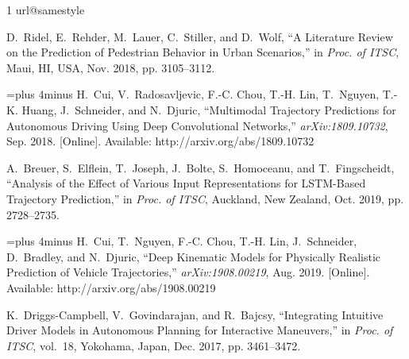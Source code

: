 \documentclass[a4paper, 10pt, conference]{ieeeconf}      %
\begin{document}
   \nocite{*}
\begin{thebibliography}{1}
\providecommand{\url}[1]{#1}
\csname url@samestyle\endcsname
\providecommand{\newblock}{\relax}
\providecommand{\bibinfo}[2]{#2}
\providecommand{\BIBentrySTDinterwordspacing}{\spaceskip=0pt\relax}
\providecommand{\BIBentryALTinterwordstretchfactor}{4}
\providecommand{\BIBentryALTinterwordspacing}{\spaceskip=\fontdimen2\font plus
\BIBentryALTinterwordstretchfactor\fontdimen3\font minus
  \fontdimen4\font\relax}
\providecommand{\BIBforeignlanguage}[2]{{%
\expandafter\ifx\csname l@#1\endcsname\relax
\typeout{** WARNING: IEEEtran.bst: No hyphenation pattern has been}%
\typeout{** loaded for the language `#1'. Using the pattern for}%
\typeout{** the default language instead.}%
\else
\language=\csname l@#1\endcsname
\fi
#2}}
\providecommand{\BIBdecl}{\relax}
\BIBdecl


D.~Ridel, E.~Rehder, M.~Lauer, C.~Stiller, and D.~Wolf, ``A {Literature}
  {Review} on the {Prediction} of {Pedestrian} {Behavior} in {Urban}
  {Scenarios},'' in \emph{Proc. of {ITSC}}, Maui, HI, USA, Nov. 2018, pp.
  3105--3112.

\BIBentryALTinterwordspacing
H.~Cui, V.~Radosavljevic, F.-C. Chou, T.-H. Lin, T.~Nguyen, T.-K. Huang,
  J.~Schneider, and N.~Djuric, ``Multimodal {Trajectory} {Predictions} for
  {Autonomous} {Driving} {Using} {Deep} {Convolutional} {Networks},''
  \emph{arXiv:1809.10732}, Sep. 2018. [Online]. Available:
  \url{http://arxiv.org/abs/1809.10732}
\BIBentrySTDinterwordspacing

A.~Breuer, S.~Elflein, T.~Joseph, J.~Bolte, S.~Homoceanu, and T.~Fing\-scheidt,
  ``Analysis of the {Effect} of {Various} {Input} {Representations} for
  {LSTM}-{Based} {Trajectory} {Prediction},'' in \emph{Proc. of {ITSC}},
  Auckland, New Zealand, Oct. 2019, pp. 2728--2735.

\BIBentryALTinterwordspacing
H.~Cui, T.~Nguyen, F.-C. Chou, T.-H. Lin, J.~Schneider, D.~Bradley, and
  N.~Djuric, ``Deep {Kinematic} {Models} for {Physically} {Realistic}
  {Prediction} of {Vehicle} {Trajectories},'' \emph{arXiv:1908.00219}, Aug.
  2019. [Online]. Available: \url{http://arxiv.org/abs/1908.00219}
\BIBentrySTDinterwordspacing

K.~Driggs-Campbell, V.~Govindarajan, and R.~Bajcsy, ``Integrating {Intuitive}
  {Driver} {Models} in {Autonomous} {Planning} for {Interactive} {Maneuvers},''
  in \emph{Proc. of {ITSC}}, vol.~18, Yokohama, Japan, Dec. 2017, pp.
  3461--3472.


\end{thebibliography}
\end{document}
